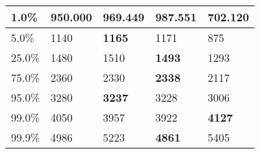 \begin{table}[H]
\begin{tabular}{|l|m{10em}|m{10em}|m{10em}|m{10em}|}
\hline 1.0\% & 950.000 & \bfseries 969.449 & 987.551 & \cellcolor[rgb]{0.9, 0.54, 0.52} 702.120 \\
\hline 5.0\% & 1140 & \bfseries 1165 & 1171 & \cellcolor[rgb]{0.9, 0.54, 0.52} 875 \\
\hline 25.0\% & 1480 & 1510 & \bfseries 1493 & \cellcolor[rgb]{0.9, 0.54, 0.52} 1293 \\
\hline 75.0\% & 2360 & 2330 & \bfseries 2338 & \cellcolor[rgb]{0.9, 0.54, 0.52} 2117 \\
\hline 95.0\% & 3280 & \bfseries 3237 & 3228 & \cellcolor[rgb]{0.9, 0.54, 0.52} 3006 \\
\hline 99.0\% & 4050 & 3957 & \cellcolor[rgb]{0.9, 0.54, 0.52} 3922 & \bfseries 4127 \\
\hline 99.9\% & 4986 & 5223 & \bfseries 4861 & \cellcolor[rgb]{0.9, 0.54, 0.52} 5405 \\
\hline
\end{tabular}
\end{table}

